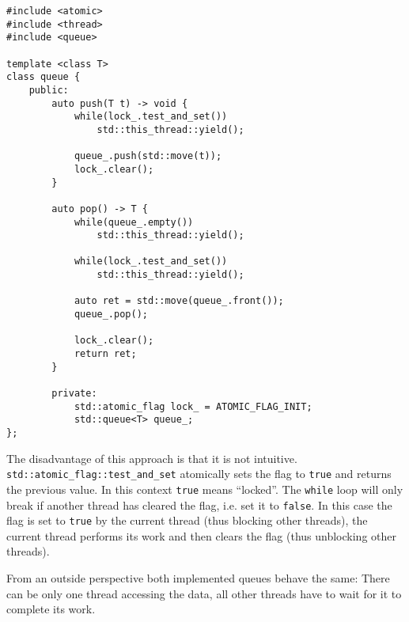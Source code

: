 \begin{verbatim}
#include <atomic>
#include <thread>
#include <queue>

template <class T>
class queue {
    public:
        auto push(T t) -> void {
            while(lock_.test_and_set())
                std::this_thread::yield();
                
            queue_.push(std::move(t));
            lock_.clear();
        }
        
        auto pop() -> T {
            while(queue_.empty())
                std::this_thread::yield();
                
            while(lock_.test_and_set())
                std::this_thread::yield();
                
            auto ret = std::move(queue_.front());
            queue_.pop();
            
            lock_.clear();
            return ret;
        }
        
        private:
            std::atomic_flag lock_ = ATOMIC_FLAG_INIT;
            std::queue<T> queue_;
};
\end{verbatim}

\noindent The disadvantage of this approach is that it is not intuitive. \texttt{std::atomic\_flag::test\_and\_set} atomically sets the flag to \texttt{true} and returns the previous value. In this context \texttt{true} means ``locked''. The \texttt{while} loop will only break if another thread has cleared the flag, i.e. set it to \texttt{false}. In this case the flag is set to \texttt{true} by the current thread (thus blocking other threads), the current thread performs its work and then clears the flag (thus unblocking other threads).

From an outside perspective both implemented queues behave the same: There can be only one thread accessing the data, all  other threads have to wait for it to complete its work.
